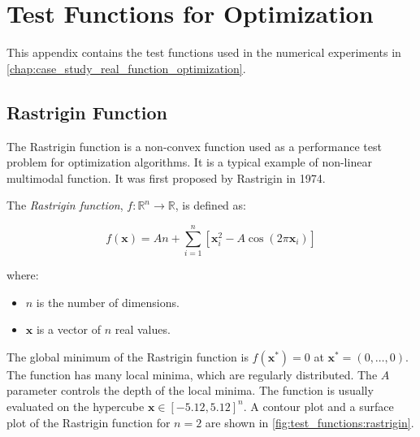 \chapter{Test Functions for Optimization}
\label{chap:test_functions}
  This appendix contains the test functions used in the numerical experiments in 
  \vref{chap:case_study_real_function_optimization}.

  \section{Rastrigin Function}
  \label{sec:test_functions:rastrigin}
    The Rastrigin function is a non-convex function used as a performance test problem for 
    optimization algorithms.
    It is a typical example of non-linear multimodal function.
    It was first proposed by Rastrigin in 1974.

    \begin{definition}
      \label{def:test_functions:rastrigin}
      The \emph{Rastrigin function}, \(f: \mathbb{R}^n \rightarrow \mathbb{R}\), is defined as:

      \begin{equation}
        \label{eq:test_functions:rastrigin}
        f(\mathbf{x}) = An + \sum_{i=1}^{n} \left[ \mathbf{x}_i^2 - A\cos(2\pi \mathbf{x}_i) \right]
      \end{equation}
        
      where:

      \begin{itemize}
        \item \(n\) is the number of dimensions.
        \item \(\mathbf{x}\) is a vector of \(n\) real values.
      \end{itemize}
    \end{definition}

    The global minimum of the Rastrigin function is \(f(\mathbf{x}^*) = 0\) at \(\mathbf{x}^* = 
    (0, \ldots, 0)\).
    The function has many local minima, which are regularly distributed.
    The \(A\) parameter controls the depth of the local minima.
    The function is usually evaluated on the hypercube \(\mathbf{x} \in [-5.12, 5.12]^n\).
    A contour plot and a surface plot of the Rastrigin function for \(n = 2\) are shown in
    \vref{fig:test_functions:rastrigin}.


